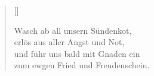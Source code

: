 \begin{center}
\settowidth{\versewidth}{Der, vor dem die Welt erschrickt,}
\begin{verse}[\versewidth]
  
 Wasch ab all unsern Sündenkot,\\
erlös aus aller Angst und Not,\\
und führ uns bald mit Gnaden ein\\
zum ewgen Fried und Freudenschein.
   
\end{verse}
\end{center}


